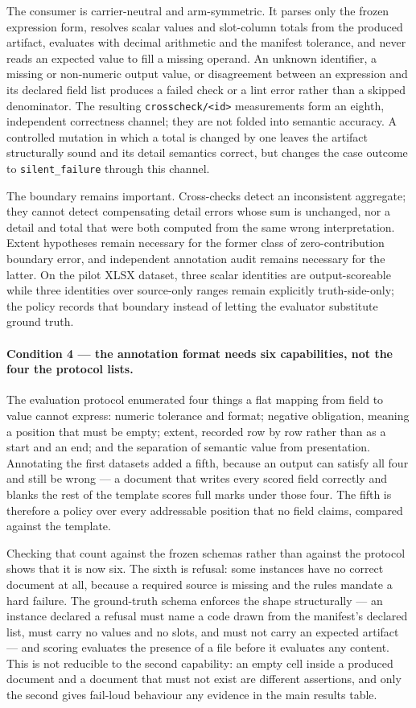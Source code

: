 The consumer is carrier-neutral and arm-symmetric. It parses only the frozen expression form,
resolves scalar values and slot-column totals from the produced artifact, evaluates with decimal
arithmetic and the manifest tolerance, and never reads an expected value to fill a missing
operand. An unknown identifier, a missing or non-numeric output value, or disagreement between
an expression and its declared field list produces a failed check or a lint error rather than a
skipped denominator. The resulting \texttt{crosscheck/<id>} measurements form an eighth,
independent correctness channel; they are not folded into semantic accuracy. A controlled
mutation in which a total is changed by one leaves the artifact structurally sound and its
detail semantics correct, but changes the case outcome to \texttt{silent\_failure} through this
channel.

The boundary remains important. Cross-checks detect an inconsistent aggregate; they cannot
detect compensating detail errors whose sum is unchanged, nor a detail and total that were both
computed from the same wrong interpretation. Extent hypotheses remain necessary for the former
class of zero-contribution boundary error, and independent annotation audit remains necessary
for the latter. On the pilot XLSX dataset, three scalar identities are output-scoreable while
three identities over source-only ranges remain explicitly truth-side-only; the policy records
that boundary instead of letting the evaluator substitute ground truth.

\paragraph{Condition 4 --- the annotation format needs six capabilities, not the four the
protocol lists.}
The evaluation protocol enumerated four things a flat mapping from field to value cannot
express: numeric tolerance and format; negative obligation, meaning a position that must be
empty; extent, recorded row by row rather than as a start and an end; and the separation of
semantic value from presentation. Annotating the first datasets added a fifth, because an
output can satisfy all four and still be wrong --- a document that writes every scored field
correctly and blanks the rest of the template scores full marks under those four. The fifth is
therefore a policy over every addressable position that no field claims, compared against the
template.

Checking that count against the frozen schemas rather than against the protocol shows that it
is now six. The sixth is refusal: some instances have no correct document at all, because a
required source is missing and the rules mandate a hard failure. The ground-truth schema
enforces the shape structurally --- an instance declared a refusal must name a code drawn from
the manifest's declared list, must carry no values and no slots, and must not carry an expected
artifact --- and scoring evaluates the presence of a file before it evaluates any content. This
is not reducible to the second capability: an empty cell inside a produced document and a
document that must not exist are different assertions, and only the second gives fail-loud
behaviour any evidence in the main results table.

